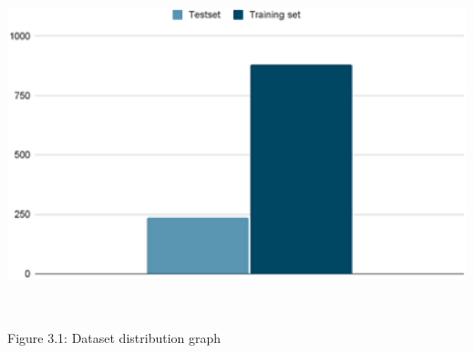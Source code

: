 \documentclass[10pt]{article} %
\begin{document}
\noindent \includegraphics*[width=6.25in, height=3.86in, keepaspectratio=false]{image7}

\noindent Figure 3.1: Dataset distribution graph
\end{document}
